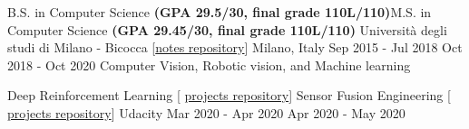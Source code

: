 

\begin{cventries}
  \cventry
  {B.S. in Computer Science \textbf{(GPA 29.5/30, final grade 110L/110)}\linebreak M.S. in Computer Science \textbf{(GPA 29.45/30, final grade 110L/110)}  } %
  {Università degli studi di Milano - Bicocca  {\tiny [\href{https://github.com/gianscarpe/unimib}{notes repository}]} } %
  {Milano, Italy} %
  {Sep 2015 - Jul 2018 \linebreak Oct 2018 - Oct 2020} %
  {Computer Vision, Robotic vision, and Machine learning
  }

  \cventry
  {Deep Reinforcement Learning {\tiny [ \href{https://github.com/gianscarpe/udacity_deep_reinforcement_learning}{projects repository}]} 	
    \linebreak
    Sensor Fusion Engineering {\tiny [ \href{https://github.com/gianscarpe/udacity_sensor_fusion}{projects repository}]}
  } %
  {Udacity} %
  {} %
  {Mar 2020 - Apr 2020 \linebreak Apr 2020 - May 2020} %
  {
  }
  \vspace{-0.7cm}
\end{cventries}
